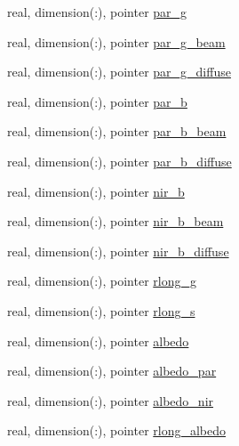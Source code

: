 \begin{DoxyCompactItemize}
\item 
real, dimension(\+:), pointer \hyperlink{structed__state__vars_1_1sitetype_a3b8fadf78414b3f3bb89968a7a634223}{par\+\_\+g}
\item 
real, dimension(\+:), pointer \hyperlink{structed__state__vars_1_1sitetype_ad74c013bc0942fb9c933da4433347fa1}{par\+\_\+g\+\_\+beam}
\item 
real, dimension(\+:), pointer \hyperlink{structed__state__vars_1_1sitetype_ae8665a57a196a97852eb380300751574}{par\+\_\+g\+\_\+diffuse}
\item 
real, dimension(\+:), pointer \hyperlink{structed__state__vars_1_1sitetype_a8d26d5d1bd3be5cb0de3ba118aa5460e}{par\+\_\+b}
\item 
real, dimension(\+:), pointer \hyperlink{structed__state__vars_1_1sitetype_ae01b420c1733e280dbe174724128e5a5}{par\+\_\+b\+\_\+beam}
\item 
real, dimension(\+:), pointer \hyperlink{structed__state__vars_1_1sitetype_ab96565393d209d34d568dcbaefb9f532}{par\+\_\+b\+\_\+diffuse}
\item 
real, dimension(\+:), pointer \hyperlink{structed__state__vars_1_1sitetype_a05f3305fc8182b54e6e5f693df2fd7bb}{nir\+\_\+b}
\item 
real, dimension(\+:), pointer \hyperlink{structed__state__vars_1_1sitetype_a5dc746aa17b70a3b4807ec54e5b3b7be}{nir\+\_\+b\+\_\+beam}
\item 
real, dimension(\+:), pointer \hyperlink{structed__state__vars_1_1sitetype_a289ffcddfed5f8abd4fae9fba934dc6d}{nir\+\_\+b\+\_\+diffuse}
\item 
real, dimension(\+:), pointer \hyperlink{structed__state__vars_1_1sitetype_afc5e5a9b3e55d29f833acaac87586c0f}{rlong\+\_\+g}
\item 
real, dimension(\+:), pointer \hyperlink{structed__state__vars_1_1sitetype_ae9ba5c893512047ef5d1d614e21f02ce}{rlong\+\_\+s}
\item 
real, dimension(\+:), pointer \hyperlink{structed__state__vars_1_1sitetype_a8027a912b702542bcff4bfe5809c57af}{albedo}
\item 
real, dimension(\+:), pointer \hyperlink{structed__state__vars_1_1sitetype_a5c9368c3511b6cc4da23bd29a8e11894}{albedo\+\_\+par}
\item 
real, dimension(\+:), pointer \hyperlink{structed__state__vars_1_1sitetype_af7c0da4fd16bf8396ff39e40702b2a82}{albedo\+\_\+nir}
\item 
real, dimension(\+:), pointer \hyperlink{structed__state__vars_1_1sitetype_aeeee48a246e76a3e99e64c6123b2834b}{rlong\+\_\+albedo}

\end{DoxyCompactItemize}
